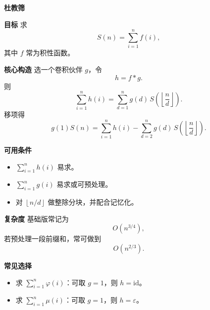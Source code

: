 \textbf{杜教筛}

\textbf{目标}
求
\[
S(n)=\sum_{i=1}^{n}f(i),
\]
其中 $f$ 常为积性函数。

\textbf{核心构造}
选一个卷积伙伴 $g$，令
\[
h=f*g.
\]
则
\[
\sum_{i=1}^{n}h(i)=\sum_{d=1}^{n}g(d)\,S\!\left(\left\lfloor\frac{n}{d}\right\rfloor\right).
\]
移项得
\[
g(1)S(n)=\sum_{i=1}^{n}h(i)-\sum_{d=2}^{n}g(d)\,S\!\left(\left\lfloor\frac{n}{d}\right\rfloor\right).
\]

\textbf{可用条件}
\begin{itemize}
\item $\sum_{i=1}^{n}h(i)$ 易求。
\item $\sum_{i=1}^{n}g(i)$ 易求或可预处理。
\item 对 $\left\lfloor n/d\right\rfloor$ 做整除分块，并配合记忆化。
\end{itemize}

\textbf{复杂度}
基础版常记为
\[
O(n^{3/4}),
\]
若预处理一段前缀和，常可做到
\[
O(n^{2/3}).
\]

\textbf{常见选择}
\begin{itemize}
\item 求 $\sum_{i=1}^{n}\varphi(i)$：可取 $g=1$，则 $h=\mathrm{id}$。
\item 求 $\sum_{i=1}^{n}\mu(i)$：可取 $g=1$，则 $h=\varepsilon$。
\end{itemize}
